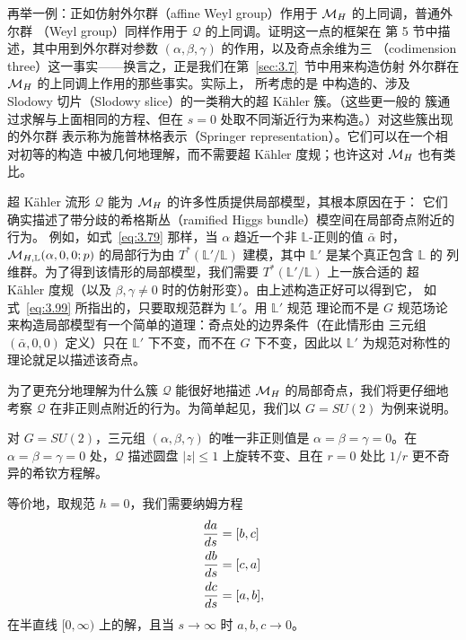 再举一例：正如仿射外尔群（affine Weyl group）作用于 ${{\mathcal{M}}_H}$ 的上同调，普通外尔群
（Weyl group）同样作用于 ${\mathcal Q}$ 的上同调。证明这一点的框架在 \cite{ref31}
第 5 节中描述，其中用到外尔群对参数 $(\alpha,\beta,\gamma)$ 的作用，以及奇点余维为三
（codimension three）这一事实——换言之，正是我们在第~\ref{sec:3.7}~节中用来构造仿射
外尔群在 ${{\mathcal{M}}_H}$ 的上同调上作用的那些事实。实际上，\cite{ref31} 所考虑的是 \cite{ref35}
中构造的、涉及 Slodowy 切片（Slodowy slice）的一类稍大的超 Kähler 簇。（这些更一般的
簇通过求解与上面相同的方程、但在 $s=0$ 处取不同渐近行为来构造。）对这些簇出现的外尔群
表示称为施普林格表示（Springer representation）。它们可以在一个相对初等的构造
\cite{ref65} 中被几何地理解，而不需要超 Kähler 度规；也许这对 ${{\mathcal{M}}_H}$ 也有类比。

超 Kähler 流形 ${\mathcal Q}$ 能为 ${{\mathcal{M}}_H}$ 的许多性质提供局部模型，其根本原因在于：
它们确实描述了带分歧的希格斯丛（ramified Higgs bundle）模空间在局部奇点附近的行为。
例如，如式~\eqref{eq:3.79} 那样，当 $\alpha$ 趋近一个非 $\mathbb{L}$-正则的值
$\bar\alpha$ 时，${\mathcal{M}}_{H,\mathbb{L}}(\alpha,0,0;p)$ 的局部行为由
$T^*(\mathbb{L}'/\mathbb{L})$ 建模，其中 $\mathbb{L}'$ 是某个真正包含 $\mathbb{L}$ 的
列维群。为了得到该情形的局部模型，我们需要 $T^*(\mathbb{L}'/\mathbb{L})$ 上一族合适的
超 Kähler 度规（以及 $\beta,\gamma\not=0$ 时的仿射形变）。由上述构造正好可以得到它，
如式~\eqref{eq:3.99} 所指出的，只要取规范群为 $\mathbb{L}'$。用 $\mathbb{L}'$ 规范
理论而不是 $G$ 规范场论来构造局部模型有一个简单的道理：奇点处的边界条件（在此情形由
三元组 $(\bar\alpha,0,0)$ 定义）只在 $\mathbb{L}'$ 下不变，而不在 $G$ 下不变，因此以
$\mathbb{L}'$ 为规范对称性的理论就足以描述该奇点。

\bigskip{}

为了更充分地理解为什么簇 ${\mathcal Q}$ 能很好地描述 ${{\mathcal{M}}_H}$ 的局部奇点，我们将更仔细地
考察 ${\mathcal Q}$ 在非正则点附近的行为。为简单起见，我们以 $G=SU(2)$ 为例来说明。

对 $G=SU(2)$，三元组 $(\alpha,\beta,\gamma)$ 的唯一非正则值是
$\alpha=\beta=\gamma=0$。在 $\alpha=\beta=\gamma=0$ 处，${\mathcal Q}$ 描述圆盘
$|z|\leq 1$ 上旋转不变、且在 $r=0$ 处比 $1/r$ 更不奇异的希钦方程解。

等价地，取规范 $h=0$，我们需要纳姆方程
\setcounter{equation}{99}
\begin{equation}\label{eq:3.100}
  \begin{aligned}{da\over ds}&=[b,c]\\
                      {db\over ds}&=[c,a]\\
                      {dc\over ds}&=[a,b],\end{aligned}
\end{equation}
在半直线 $[0,\infty)$ 上的解，且当 $s\to \infty$ 时 $a,b,c\to 0$。

